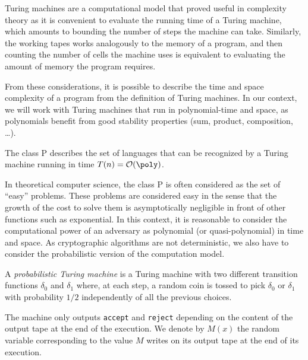 Turing machines are a computational model that proved useful in complexity theory as it is convenient to evaluate the running time of a Turing machine, which amounts to bounding the number of steps the machine can take.
Similarly, the working tapes works analogously to the memory of a program, and then counting the number of cells the machine uses is equivalent to evaluating the amount of memory the program requires.

From these considerations, it is possible to describe the time and space complexity of a program from the definition of Turing machines.
In our context, we will work with Turing machines that run in polynomial-time and space, as polynomials benefit from good stability properties (sum, product, composition, \ldots{}).

\begin{definition} 
  The class \textsf{P} describes the set of languages that can be recognized by a Turing machine running in time $T(n) = \bigO(\poly)$.
\end{definition}

In theoretical computer science, the class \textsf{P} is often considered as the set of ``easy'' problems.
These problems are considered easy in the sense that the growth of the cost to solve them is asymptotically negligible in front of other functions such as exponential.
In this context, it is reasonable to consider the computational power of an adversary as polynomial (or quasi-polynomial) in time and space.
As cryptographic algorithms are not deterministic, we also have to consider the probabilistic version of the computation model.

\begin{definition} \label{de:probabilistic-tm} 
  A \emph{probabilistic Turing machine} is a Turing machine with two different transition functions $\delta_0$ and $\delta_1$ where, at each step, a random coin is tossed to pick $\delta_0$ or $\delta_1$ with probability $1/2$ independently of all the previous choices.

  The machine only outputs \texttt{accept} and \texttt{reject} depending on the content of the output tape at the end of the execution.
  We denote by $M(x)$ the random variable corresponding to the value $M$ writes on its output tape at the end of its execution.
\end{definition}

